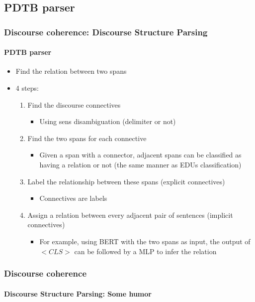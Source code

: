 \documentclass[xcolor=table]{beamer}
\begin{document}
\subsection{PDTB parser}

\begin{frame}
	\frametitle{Discourse coherence: Discourse Structure Parsing}
	\framesubtitle{PDTB parser}
	
	\begin{itemize}
		\item Find the relation between two spans
		\item 4 steps: 
		\begin{enumerate}
			\item Find the discourse connectives
			\begin{itemize}
				\item Using sens disambiguation (delimiter or not)
			\end{itemize}
			\item Find the two spans for each connective
			\begin{itemize}
				\item Given a span with a connector, adjacent spans can be classified as having a relation or not (the same manner as EDUs classification)
			\end{itemize}
			\item Label the relationship between these spans (explicit connectives)
			\begin{itemize}
				\item Connectives are labels
			\end{itemize}
			\item Assign a relation between every adjacent pair of sentences (implicit connectives)
			\begin{itemize}
				\item For example, using BERT with the two spans as input, the output of $ <CLS> $ can be followed by a MLP to infer the relation
			\end{itemize}
		\end{enumerate}
	\end{itemize}
	
\end{frame}

\begin{frame}
	\frametitle{Discourse coherence}
	\framesubtitle{Discourse Structure Parsing: Some humor}
	
	\begin{center}
	\end{center}
	
\end{frame}
\end{document}
